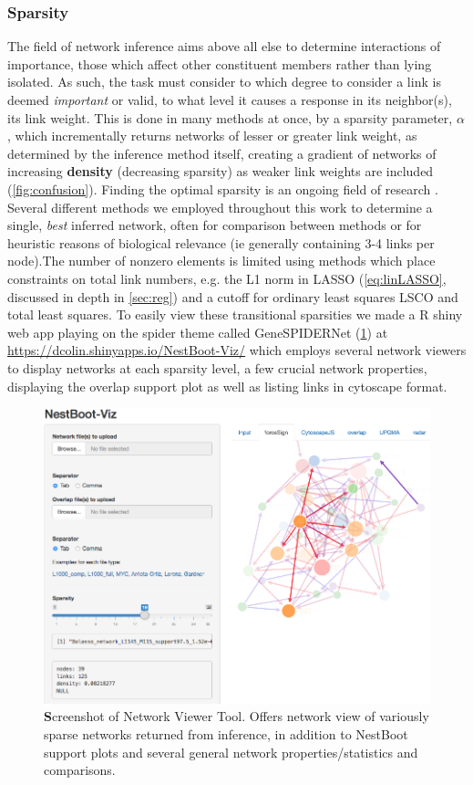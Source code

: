 \subsubsection{Sparsity}
\label{sec:spar}
The field of network inference aims above all else to determine interactions of importance, those which affect other constituent members rather than lying isolated. As such, the task must consider to which degree to consider a link is deemed \emph{important} or valid, to what level it causes a response in its neighbor(s), \ie its link weight. This is done in many methods at once, by a sparsity parameter, $\alpha$, which incrementally returns networks of lesser or greater link weight, as determined by the inference method itself, creating a gradient of networks of increasing \textbf{density} (decreasing sparsity) as weaker link weights are included (\cref{fig:confusion}). Finding the optimal sparsity is an ongoing field of research \citep{tjarnberg2013optimal}. Several different methods we employed throughout this work to determine a single, \emph{best} inferred network, often for comparison between methods or for heuristic reasons of biological relevance (ie generally containing 3-4 links per node).The number of nonzero elements is limited using methods which place constraints on total link numbers, e.g. the L1 norm in LASSO (\cref{eq:linLASSO}, discussed in depth in \cref{sec:reg}) and a cutoff for ordinary least squares LSCO and total least squares. To easily view these transitional sparsities we made a R shiny web app playing on the spider theme called GeneSPIDERNet (\cref{fig:GSweb}) at \url{https://dcolin.shinyapps.io/NestBoot-Viz/} which employs several network viewers to display networks at each sparsity level, a few crucial network properties, displaying the overlap support plot as well as listing links in cytoscape format.


\begin{figure}
\centering
\includegraphics[width=1\linewidth]{4/NestBoot-Viz2.png}
\caption{{\textbf Screenshot of Network Viewer Tool.} Offers network view of variously sparse networks returned from inference, in addition to NestBoot support plots and several general network properties/statistics and comparisons.}
\label{fig:GSweb}
\end{figure}

